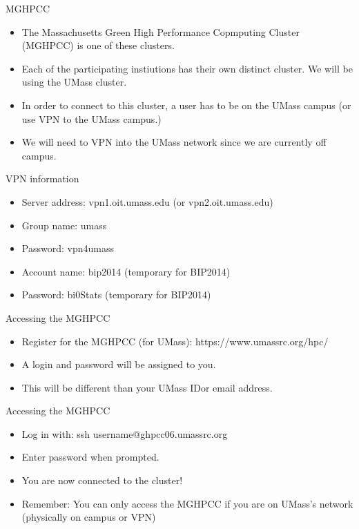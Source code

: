 \begin{frame}{MGHPCC}
\begin{itemize}
\item The Massachusetts Green High Performance Copmputing Cluster (MGHPCC) is one of these clusters.  
\item Each of the participating instiutions has their own distinct cluster. We will be using the UMass cluster.
\item In order to connect to this cluster, a user has to be on the UMass campus (or use VPN to the UMass campus.)
\item We will need to VPN into the UMass network since we are currently off campus.  
\end{itemize}
\end{frame}

\begin{frame}{VPN information}
\begin{itemize}
\item Server address: vpn1.oit.umass.edu (or vpn2.oit.umass.edu)
\item Group name: umass
\item Password: vpn4umass
\item Account name: bip2014 (temporary for BIP2014)
\item Password: bi0Stats (temporary for BIP2014)
\end{itemize}
\end{frame}

\begin{frame}{Accessing the MGHPCC}
\begin{itemize}
\item Register for the MGHPCC (for UMass): https://www.umassrc.org/hpc/
\item A login and password will be assigned to you. 
\item This will be different than your UMass IDor email address.
\end{itemize}
\end{frame}


\begin{frame}{Accessing the MGHPCC}
\begin{itemize}
\item Log in with: ssh username@ghpcc06.umassrc.org
\item Enter password when prompted.  
\item You are now connected to the cluster!
\item Remember: You can only access the MGHPCC if you are on UMass's network (physically on campus or VPN)
\end{itemize}
\end{frame}

